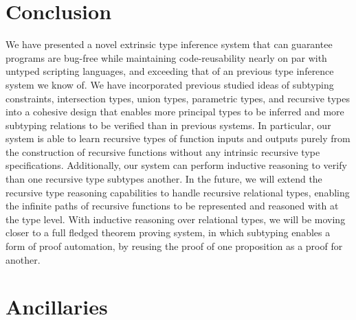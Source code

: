 \documentclass[acmsmall]{acmart}
\theoremstyle{definition}
\begin{document}



\section{Conclusion}
\label{sec:conclusion}
We have presented a novel extrinsic type inference system
that can guarantee programs are bug-free while maintaining
code-reusability nearly on par with untyped scripting languages,
and exceeding that of an previous type inference system we know of.  
We have incorporated previous studied ideas of subtyping constraints,
intersection types, union types, parametric types, and recursive types into
a cohesive design that enables more principal types to be inferred 
and more subtyping relations to be verified than in previous systems. 
In particular, our system is able to learn recursive types of function inputs
and outputs purely from the construction of recursive functions without 
any intrinsic recursive type specifications.
Additionally, our system can perform inductive reasoning to
verify than one recursive type subtypes another.
In the future, we will extend the recursive type reasoning capabilities
to handle recursive relational types, enabling the infinite paths
of recursive functions to be represented and reasoned with at the type level. 
With inductive reasoning over relational types, we will be
moving closer to a full fledged theorem proving system,
in which subtyping enables a form of proof automation,
by reusing the proof of one proposition as a proof for another. 

\newpage

\begin{thebibliography}{9}




\end{thebibliography}


\newpage



\section{Ancillaries}
\label{sec:ancillaries}
\end{document}
